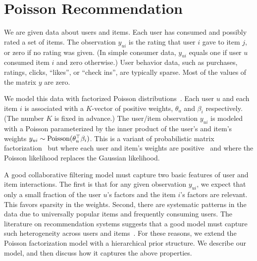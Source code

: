 \section{Poisson Recommendation}
\label{sec:model}


We are given data about users and items.  Each user has consumed and
possibly rated a set of items.  The observation $y_{ui}$ is the rating
that user $i$ gave to item $j$, or zero if no rating was given.  (In
simple consumer data, $y_{ui}$ equals one if user $u$ consumed item
$i$ and zero otherwise.)  User behavior data, such as purchases,
ratings, clicks, ``likes'', or ``check ins'', are typically sparse.
Most of the values of the matrix $y$ are zero.

We model this data with factorized Poisson
distributions~\cite{Canny:2004}. Each user $u$ and each item $i$ is
associated with a $K$-vector of positive weights, $\theta_u$ and
$\beta_i$ respectively.  (The number $K$ is fixed in advance.)  The
user/item observation $y_{ui}$ is modeled with a Poisson parameterized
by the inner product of the user's and item's weights $y_{ui} \sim
\textrm{Poisson}(\theta_u^\top \beta_i)$.  This is a variant of probabilistic
matrix factorization~\cite{Salakhutdinov:2008a} but where each user
and item's weights are positive~\cite{Lee:1999} and where the Poisson
likelihood replaces the Gaussian likelihood.

A good collaborative filtering model must capture two basic features
of user and item interactions. The first is that for any given
observation $y_{ui}$, we expect that only a small fraction of the user
$u$'s factors and the item $i$'s factors are relevant. This favors
sparsity in the weights. Second, there are systematic patterns in the
data due to universally popular items and frequently consuming users.
The literature on recommendation systems suggests that a good model
must capture such heterogeneity across users and
items~\cite{Koren:2009}. For these reasons, we extend the Poisson
factorization model with a hierarchical prior structure. We describe
our model, and then discuss how it captures the above properties.



